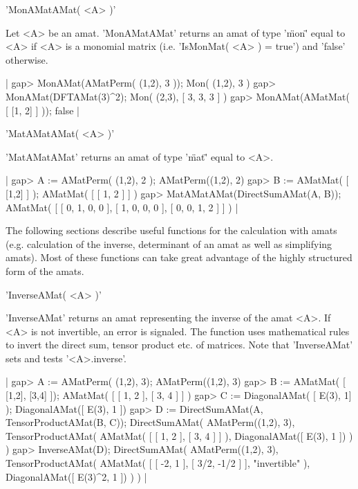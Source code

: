 'MonAMatAMat( <A> )'

Let <A> be an amat. 'MonAMatAMat' returns an amat of type '\"mon\"'
equal to <A> if <A> is a monomial matrix (i.e. 'IsMonMat( <A> ) = true')
and 'false' otherwise. 

|    gap> MonAMat(AMatPerm( (1,2), 3 ));
    Mon( (1,2), 3 )
    gap> MonAMat(DFTAMat(3)^2);
    Mon(
      (2,3),
      [ 3, 3, 3 ]
    )
    gap> MonAMat(AMatMat( [ [1, 2] ] ));
    false |


'MatAMatAMat( <A> )'

'MatAMatAMat' returns an amat of type '\"mat\"' equal to <A>.

|    gap> A := AMatPerm( (1,2), 2 );
    AMatPerm((1,2), 2)
    gap> B := AMatMat( [ [1,2] ] );
    AMatMat(
      [ [ 1, 2 ] ]
    )
    gap> MatAMatAMat(DirectSumAMat(A, B));
    AMatMat(
      [ [ 0, 1, 0, 0 ], [ 1, 0, 0, 0 ], [ 0, 0, 1, 2 ] ]
    ) |


The following sections describe useful functions for the calculation
with amats (e.g. calculation of the inverse, determinant of an amat 
as well as simplifying amats).
Most of these functions can take great advantage of the highly structured
form of the amats.


'InverseAMat( <A> )'

'InverseAMat' returns an amat representing the inverse of the amat <A>.
If <A> is not invertible, an error is signaled. The function uses 
mathematical rules to invert the direct sum, tensor product etc. of 
matrices. Note that 'InverseAMat' sets and tests '<A>.inverse'.

|    gap> A := AMatPerm( (1,2), 3);                   
    AMatPerm((1,2), 3)
    gap> B := AMatMat( [ [1,2], [3,4] ]);
    AMatMat(
      [ [ 1, 2 ], [ 3, 4 ] ]
    )
    gap> C := DiagonalAMat( [ E(3), 1] );
    DiagonalAMat([ E(3), 1 ])
    gap> D := DirectSumAMat(A, TensorProductAMat(B, C));
    DirectSumAMat(
      AMatPerm((1,2), 3),
      TensorProductAMat(
        AMatMat( [ [ 1, 2 ], [ 3, 4 ] ] ),
        DiagonalAMat([ E(3), 1 ])
      )
    )
    gap> InverseAMat(D);
    DirectSumAMat(
      AMatPerm((1,2), 3),
      TensorProductAMat(
        AMatMat(
          [ [ -2, 1 ], [ 3/2, -1/2 ] ],
          "invertible"
        ),
        DiagonalAMat([ E(3)^2, 1 ])
      )
    ) |

